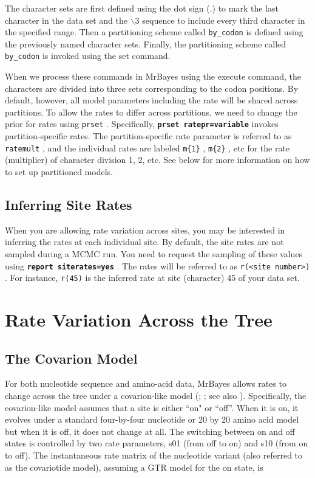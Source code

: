 \documentclass[12pt]{book}
\newcommand{\ttt}[1]{\texttt{#1} }
\newcommand{\tb}[1]{\texttt{\textbf{#1}} }
\begin{document}
The character sets are first defined using the dot sign (.) to mark the last character in the
data set and the $\backslash$3 sequence to include every third character in the specified range. Then
a partitioning scheme called \ttt{by\_codon} is defined using the previously named character
sets. Finally, the partitioning scheme called \ttt{by\_codon} is invoked using the set
command.

When we process these commands in MrBayes using the execute command, the
characters are divided into three sets corresponding to the codon positions. By default,
however, all model parameters including the rate will be shared across partitions. To
allow the rates to differ across partitions, we need to change the prior for rates using
\ttt{prset}. Specifically, \tb{prset ratepr=variable} invokes partition-specific rates.
The partition-specific rate parameter is referred to as \ttt{ratemult}, and the individual rates
are labeled \ttt{m\{1\}}, \ttt{m\{2\}}, etc for the rate (multiplier) of character division 1, 2, etc. See
below for more information on how to set up partitioned models.

\subsection{Inferring Site Rates}
When you are allowing rate variation across sites, you may be interested in inferring the
rates at each individual site. By default, the site rates are not sampled during a MCMC
run. You need to request the sampling of these values using \tb{report
siterates=yes}. The rates will be referred to as \ttt{r(<site number>)}. For
instance, \ttt{r(45)} is the inferred rate at site (character) 45 of your data set.

\section{Rate Variation Across the Tree}

\subsection{The Covarion Model}
For both nucleotide sequence and amino-acid data, MrBayes allows rates to change
across the tree under a covarion-like model (\citet{tuffley98}; \citet{huelsenbeck02a};
see also \citet{galtier01}). Specifically, the covarion-like model assumes that a site is either
``on" or ``off''. When it is on, it evolves under a standard four-by-four nucleotide or 20 by
20 amino acid model but when it is off, it does not change at all. The switching between
on and off states is controlled by two rate parameters, s01 (from off to on) and s10 (from
on to off). The instantaneous rate matrix of the nucleotide variant (also referred to as the
covariotide model), assuming a GTR model for the on state, is
\end{document}
